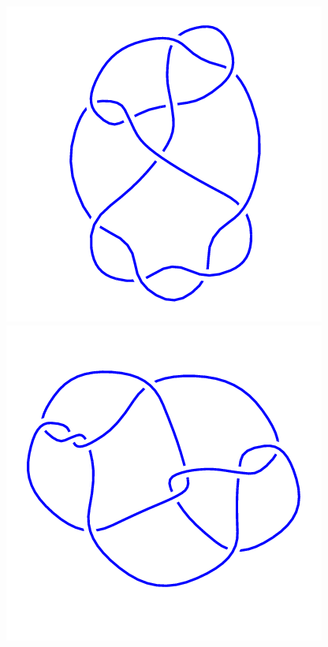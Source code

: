 \begin{figure}[H]
	\begin{minipage}[b]{.18\linewidth}
		\centering
		\includegraphics[width=\linewidth]{../data/10_127.png}
	\end{minipage}
	\begin{minipage}[b]{.18\linewidth}
		\centering
		\includegraphics[width=\linewidth]{../data/10_128.png}

\end{minipage}
\end{figure}
